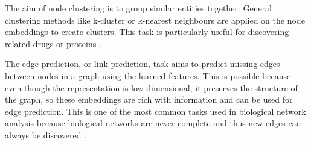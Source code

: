 The aim of node clustering is to group similar entities together.
General clustering methods like k-cluster or k-nearest neighbours are applied on the node embeddings to create clusters.
This task is particularly useful for discovering related drugs or proteins \cite{hamilton_representation_nodate}.

The edge prediction, or link prediction, task aims to predict missing edges between nodes in a graph using the learned features.
This is possible because even though the representation is low-dimensional, it preserves the structure of the graph, so these embeddings are rich with information and can be used for edge prediction.
This is one of the most common tasks used in biological network analysis because biological networks are never complete and thus new edges can always be discovered \cite{hamilton_representation_nodate}.
